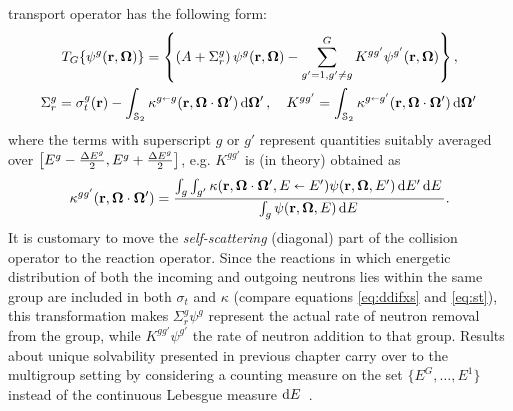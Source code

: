 transport operator has the following form:
\begin{equation*}
\begin{gathered}
    T_G\{\psi^g(\br,\bomega)\} = \left\{\left(A + \Sigma_r^g\right)\psi^g(\br,\bomega) - \summ{g'=1,g'\neq g}{G}
    K^{gg'}\psi^{g'}(\br,\bomega)\right\},\\
    \Sigma_r^g = \sigma_t^g(\br) - \intA[']{\kappa^{g\sla g}(\br,\bomega\cdot\bomega')},\quad K^{gg'} = 
    \intA[']{\kappa^{g\sla g'}(\br,\bomega\cdot\bomega')}
\end{gathered}
\end{equation*}
where the terms with superscript $g$ or $g'$ represent quantities suitably averaged over 
\mbox{$\bigl[E^{g}-\dEh{g}, E^{g}+\dEh{g}\bigr]$}, e.g. $K^{gg'}$ is (in theory) obtained as
\begin{equation}\label{eq:mg-kappa}
	\kappa^{gg'}(\br,\bomega\cdot\bomega') = \frac{\int_{g}\int_{g'} \kappa(\br,\bomega\cdot\bomega',E \sla
	E')\psi(\br,\bomega,E')\,\d{E'}\d{E}}{\int_{g}\psi(\br, \bomega, E)\,\d{E}}.
\end{equation}
It is customary to move the \textit{self-scattering} (diagonal) part of the
collision operator to the reaction operator. Since the reactions in which energetic distribution of both the incoming 
and outgoing neutrons lies within the same group are included in both $\sigma_t$ and $\kappa$  (compare equations
\eqref{eq:ddifxs} and \eqref{eq:st}), this transformation makes $\Sigma_r^g\psi^g$ represent the actual rate of neutron
removal from the group, while $K^{gg'}\psi^{g'}$ the rate of neutron addition to that group. Results about unique
solvability presented in previous chapter carry over to the multigroup setting by considering a counting measure on the
set $\{E^G,\ldots,E^1\}$ instead of the continuous Lebesgue measure $\d{E}$ \cite[Chap. XXI \S 2]{DautrayLions}.

